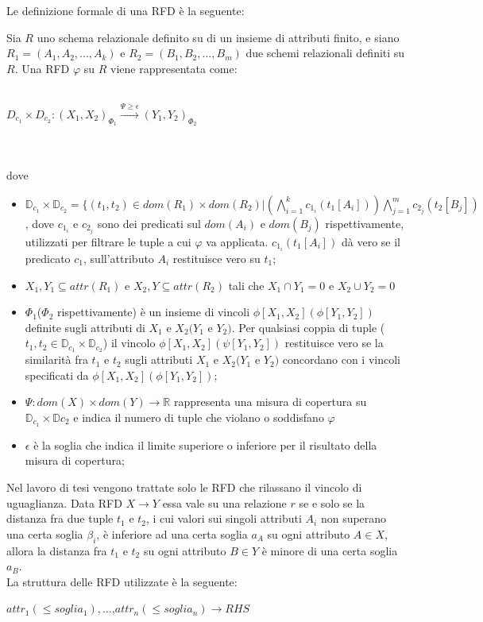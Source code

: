 Le definizione formale di una RFD è la seguente:
\begin{theorem}
Sia $R$ uno schema relazionale definito su di un insieme di attributi finito, e siano $R_1=(A_1,A_2,...,A_k)$ e $R_2=(B_1,B_2,...,B_m)$ due schemi relazionali definiti su $R$. Una RFD $\varphi$ su $R$ viene rappresentata come:
\\
\\
\centerline{$D_{c_1} \times D_{c_2}:(X_1,X_2)_{\Phi_1} \xrightarrow{\Psi\geq\epsilon}(Y_1,Y_2)_{\Phi_2}$}
\\
\\
dove 
\begin{itemize}
\item $\mathbb{D}_{c_1}\times \mathbb{D}_{c_2} = \{(t_1,t_2)\in dom(R_1)\times dom(R_2)|(\bigwedge_{i=1}^{k} c_{1_i}(t_1[A_i])) \bigwedge_{j=1}^{m} c_{2_j}(t_2[B_j])$, dove $c_{1_i}$ e $c_{2_j}$ sono dei predicati sul $dom(A_i)$ e $dom(B_j)$ rispettivamente, utilizzati per filtrare le tuple a cui $\varphi$ va applicata.
$c_{1_i}(t_1[A_i])$ dà vero se il predicato $c_1$, sull'attributo $A_i$ restituisce vero su $t_1$;
\item $X_1,Y_1 \subseteq attr(R_1)$ e $X_2,Y\subseteq attr(R_2)$ tali che $X_1\cap Y_1=0$ e $X_2\cup Y_2=0 $
\item $\Phi_1$($\Phi_2$ rispettivamente) è un insieme di vincoli $\phi[X_1,X_2](\phi[Y_1,Y_2])$ definite sugli attributi di $X_1$ e $X_2(Y_1$ e $Y_2)$. Per qualsiasi coppia di tuple ($t_1,t_2 \in \mathbb{D}_{c_1} \times \mathbb{D}_{c_2}$) il vincolo $\phi[X_1,X_2](\psi[Y_1,Y_2])$ restituisce vero se la similarità fra $t_1$ e $t_2$ sugli attributi $X_1$ e $X_2(Y_1$ e $Y_2)$ concordano con i vincoli specificati da $\phi[X_1,X_2](\phi[Y_1,Y_2])$;
\item $\Psi: dom(X) \times dom(Y)\xrightarrow{}\mathbb{R}$ rappresenta una misura di copertura su $\mathbb{D}_{c_1} \times \mathbb{D}{c_2}$ e indica il numero di tuple che violano o soddisfano $\varphi$
\item $\epsilon$ è la soglia che indica il limite superiore o inferiore per il risultato della misura di copertura;
\end{itemize}
\end{theorem}


Nel lavoro di tesi vengono trattate solo le RFD che rilassano il vincolo di uguaglianza. Data RFD $X \xrightarrow{} Y$ essa vale su una relazione $r$ se e solo se la distanza fra due tuple $t_1$ e $t_2$, i cui valori sui singoli attributi $A_i$ non superano una certa soglia $\beta_i$, è inferiore ad una certa soglia $a_A$ su ogni attributo $A \in X$, allora la distanza fra $t_1$ e $t_2$ su ogni attributo $B \in Y$ è minore di una certa soglia $a_B$.\\
La struttura delle RFD utilizzate è la seguente:
\newline
\newline
\centerline{$attr_1(\leq soglia_1),\ldots$,$attr_n(\leq soglia_n) \xrightarrow{} RHS$}

